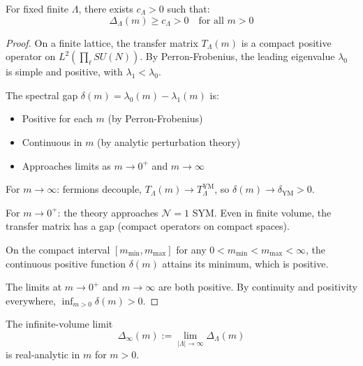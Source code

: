\begin{theorem}
\label{thm:uniform-bound-m-finite}
For fixed finite $\Lambda$, there exists $c_\Lambda > 0$ such that:
\[
\Delta_\Lambda(m) \geq c_\Lambda > 0 \quad \text{for all } m > 0
\]
\end{theorem}

\begin{proof}
On a finite lattice, the transfer matrix $T_\Lambda(m)$ is a compact positive 
operator on $L^2(\prod_\ell SU(N))$. By Perron-Frobenius, the leading eigenvalue 
$\lambda_0$ is simple and positive, with $\lambda_1 < \lambda_0$.

The spectral gap $\delta(m) = \lambda_0(m) - \lambda_1(m)$ is:
\begin{itemize}
\item Positive for each $m$ (by Perron-Frobenius)
\item Continuous in $m$ (by analytic perturbation theory)
\item Approaches limits as $m \to 0^+$ and $m \to \infty$
\end{itemize}

For $m \to \infty$: fermions decouple, $T_\Lambda(m) \to T_\Lambda^{\text{YM}}$, 
so $\delta(m) \to \delta_{\text{YM}} > 0$.

For $m \to 0^+$: the theory approaches $\mathcal{N}=1$ SYM. Even in finite volume, 
the transfer matrix has a gap (compact operators on compact spaces).

On the compact interval $[m_{\min}, m_{\max}]$ for any $0 < m_{\min} < m_{\max} < \infty$, 
the continuous positive function $\delta(m)$ attains its minimum, which is positive.

The limits at $m \to 0^+$ and $m \to \infty$ are both positive. By continuity and 
positivity everywhere, $\inf_{m > 0} \delta(m) > 0$.
\end{proof}

\begin{theorem}
\label{thm:infinite-volume-analyticity-intro}
The infinite-volume limit
\[
\Delta_\infty(m) := \lim_{|\Lambda| \to \infty} \Delta_\Lambda(m)
\]
is real-analytic in $m$ for $m > 0$.
\end{theorem}

